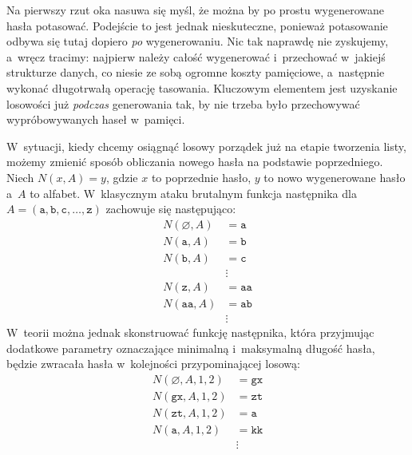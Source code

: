\begin{myenumerate}
    \item Na pierwszy rzut oka nasuwa się myśl, że można by po prostu
    wygenerowane hasła potasować. Podejście to jest jednak nieskuteczne,
    ponieważ potasowanie odbywa się tutaj dopiero \emph{po} wygenerowaniu. Nic
    tak naprawdę nie zyskujemy, a~wręcz tracimy: najpierw należy całość
    wygenerować i~przechować w~jakiejś strukturze danych, co niesie ze sobą
    ogromne koszty pamięciowe, a~następnie wykonać długotrwałą operację
    tasowania. Kluczowym elementem jest uzyskanie losowości już \emph{podczas}
    generowania tak, by nie trzeba było przechowywać wypróbowywanych haseł
    w~pamięci.

    \item W~sytuacji, kiedy chcemy osiągnąć losowy porządek już na etapie
    tworzenia listy, możemy zmienić sposób obliczania nowego hasła na podstawie
    poprzedniego. Niech $N(x, A)=y$, gdzie $x$ to poprzednie hasło, $y$ to
    nowo wygenerowane hasło a~$A$ to alfabet. W~klasycznym ataku brutalnym
    funkcja następnika dla $A=(\mathtt{a}, \mathtt{b}, \mathtt{c}, \ldots,
    \mathtt{z})$ zachowuje się następująco:
    \[
        \begin{aligned}
            N(\varnothing, A) &= \mathtt{a} \\
            N(\mathtt{a},  A) &= \mathtt{b} \\
            N(\mathtt{b},  A) &= \mathtt{c} \\
            &\vdots \\
            N(\mathtt{z},  A) &= \mathtt{aa} \\
            N(\mathtt{aa}, A) &= \mathtt{ab} \\
            &\vdots
        \end{aligned}
    \]
    W~teorii można jednak skonstruować funkcję następnika, która przyjmując
    dodatkowe parametry oznaczające minimalną i~maksymalną długość hasła,
    będzie zwracała hasła w~kolejności przypominającej losową:
    \[
        \begin{aligned}
            N(\varnothing, A, 1, 2) &= \mathtt{gx} \\
            N(\mathtt{gx}, A, 1, 2) &= \mathtt{zt} \\
            N(\mathtt{zt}, A, 1, 2) &= \mathtt{a} \\
            N(\mathtt{a}, A, 1, 2) &= \mathtt{kk} \\
            &\vdots
        \end{aligned}
    \]


\end{myenumerate}
